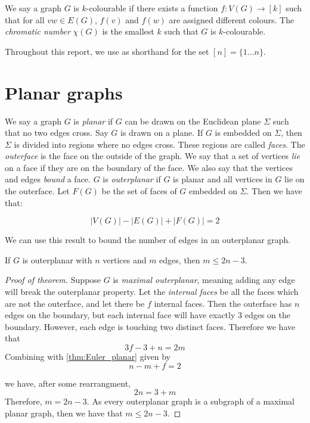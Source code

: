 We say a graph $G$ is $k$-colourable if there exists a function $f: V(G) \rightarrow [k]$ such that for all $vw \in E(G)$, $f(v)$ and $f(w)$ are assigned different colours. The \textit{chromatic number} $\chi(G)$ is the smallest $k$ such that $G$ is $k$-colourable. 

Throughout this report, we use as shorthand for the set $[n] = \lbrace 1... n \rbrace$. 

\section{Planar graphs}\label{sec:Planar graphs}
We say a graph $G$ is \textit{planar} if $G$ can be drawn on the Euclidean plane $\Sigma$ such that no two edges cross. Say $G$ is drawn on a plane. If $G$ is embedded on $\Sigma$, then $\Sigma$ is divided into regions where no edges cross. These regions are called \textit{faces}. The \textit{outerface} is the face on the outside of the graph. We say that a set of vertices \textit{lie} on a face if they are on the boundary of the face. We also say that the vertices and edges \textit{bound} a face. $G$ is \textit{outerplanar} if $G$ is planar and all vertices in $G$ lie on the outerface. 
Let $F(G)$ be the set of faces of $G$ embedded on $\Sigma$. Then we have that:
\begin{theorem}\label{thm:Euler_planar}
	\begin{equation}
		|V(G)| - |E(G)| + |F(G)| = 2
	\end{equation}
\end{theorem}

We can use this result to bound the number of edges in an outerplanar graph.
\begin{theorem}\label{thm:outerplanar_bound}
	If $G$ is outerplanar with $n$ vertices and $m$ edges, then $m \leq 2n - 3$.
\end{theorem}

\begin{proof}[Proof of theorem]
	Suppose $G$ is \textit{maximal outerplanar}, meaning adding any edge will break the outerplanar property. Let the \textit{internal faces} be all the faces which are not the outerface, and let there be $f$ internal faces. Then the outerface has $n$ edges on the boundary, but each internal face will have exactly $3$ edges on the boundary. However, each edge is touching two distinct faces. Therefore we have that
	\begin{equation}
		3 f - 3 + n = 2m
	\end{equation}
	Combining with \cref{thm:Euler_planar} given by
	\begin{equation}
		n - m + f = 2
	\end{equation}
	
	we have, after some rearrangment, 
	\begin{equation}
		2n = 3 + m
	\end{equation}
	Therefore, $m = 2n - 3$. As every outerplanar graph is a subgraph of a maximal planar graph, then we have that $m \leq 2n - 3$. 
\end{proof}
